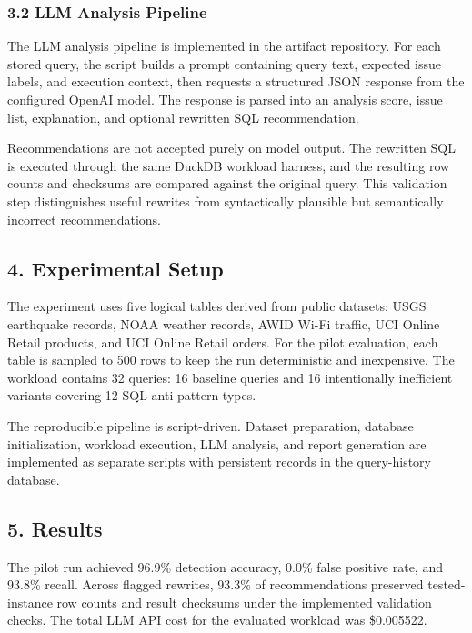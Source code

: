 \subsubsection{3.2 LLM Analysis Pipeline}\label{llm-analysis-pipeline}

The LLM analysis pipeline is implemented in the artifact repository. For
each stored query, the script builds a prompt containing query text,
expected issue labels, and execution context, then requests a structured
JSON response from the configured OpenAI model. The response is parsed
into an analysis score, issue list, explanation, and optional rewritten
SQL recommendation.

Recommendations are not accepted purely on model output. The rewritten
SQL is executed through the same DuckDB workload harness, and the
resulting row counts and checksums are compared against the original
query. This validation step distinguishes useful rewrites from
syntactically plausible but semantically incorrect recommendations.

\subsection{4. Experimental Setup}\label{experimental-setup}

The experiment uses five logical tables derived from public datasets:
USGS earthquake records, NOAA weather records, AWID Wi-Fi traffic, UCI
Online Retail products, and UCI Online Retail orders. For the pilot
evaluation, each table is sampled to 500 rows to keep the run
deterministic and inexpensive. The workload contains 32 queries: 16
baseline queries and 16 intentionally inefficient variants covering 12
SQL anti-pattern types.

The reproducible pipeline is script-driven. Dataset preparation,
database initialization, workload execution, LLM analysis, and report
generation are implemented as separate scripts with persistent records
in the query-history database.

\subsection{5. Results}\label{results}

The pilot run achieved 96.9\% detection accuracy, 0.0\% false positive
rate, and 93.8\% recall. Across flagged rewrites, 93.3\% of
recommendations preserved tested-instance row counts and result checksums
under the implemented validation checks. The total LLM API cost for the
evaluated workload was \$0.005522.

